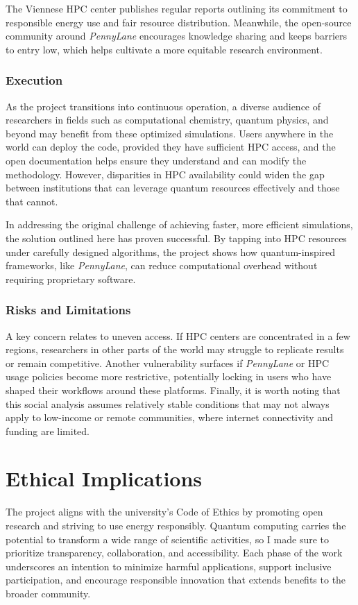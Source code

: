 The Viennese HPC center publishes regular reports outlining its commitment to responsible energy use and fair resource distribution. Meanwhile, the open-source community around \emph{PennyLane} encourages knowledge sharing and keeps barriers to entry low, which helps cultivate a more equitable research environment.

\subsubsection{Execution}
As the project transitions into continuous operation, a diverse audience of researchers in fields such as computational chemistry, quantum physics, and beyond may benefit from these optimized simulations. Users anywhere in the world can deploy the code, provided they have sufficient HPC access, and the open documentation helps ensure they understand and can modify the methodology. However, disparities in HPC availability could widen the gap between institutions that can leverage quantum resources effectively and those that cannot.

In addressing the original challenge of achieving faster, more efficient simulations, the solution outlined here has proven successful. By tapping into HPC resources under carefully designed algorithms, the project shows how quantum-inspired frameworks, like \emph{PennyLane}, can reduce computational overhead without requiring proprietary software.

\subsubsection{Risks and Limitations}
A key concern relates to uneven access. If HPC centers are concentrated in a few regions, researchers in other parts of the world may struggle to replicate results or remain competitive. Another vulnerability surfaces if \emph{PennyLane} or HPC usage policies become more restrictive, potentially locking in users who have shaped their workflows around these platforms. Finally, it is worth noting that this social analysis assumes relatively stable conditions that may not always apply to low-income or remote communities, where internet connectivity and funding are limited.

\section{Ethical Implications}
The project aligns with the university’s Code of Ethics by promoting open research and striving to use energy responsibly. Quantum computing carries the potential to transform a wide range of scientific activities, so I made sure to prioritize transparency, collaboration, and accessibility. Each phase of the work underscores an intention to minimize harmful applications, support inclusive participation, and encourage responsible innovation that extends benefits to the broader community.

